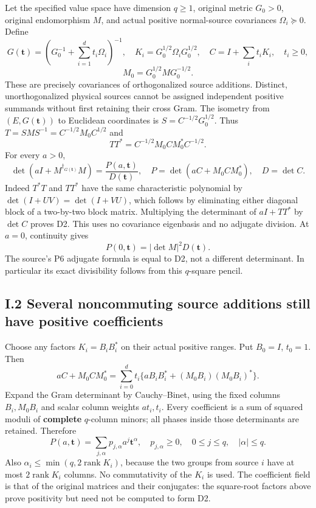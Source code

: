 \documentclass[11pt]{article}
\begin{document}
Let the specified value space have dimension \(q\ge1\), original metric \(G_0>0\), original endomorphism \(M\), and actual positive normal-source covariances \(\Omega_i\succeq0\). Define \[
 G(\boldsymbol t)=(G_0^{-1}+\sum_{i=1}^d t_i\Omega_i)^{-1},\quad
 K_i=G_0^{1/2}\Omega_iG_0^{1/2},\quad
 C=I+\sum_i t_iK_i,\quad t_i\ge0,
\] \[
 M_0=G_0^{1/2}MG_0^{-1/2}.
 \tag{D1}
\] These are precisely covariances of orthogonalized source additions. Distinct, unorthogonalized physical sources cannot be assigned independent positive summands without first retaining their cross Gram. The isometry from \((E,G(\boldsymbol t))\) to Euclidean coordinates is \(S=C^{-1/2}G_0^{1/2}\). Thus \(T=SMS^{-1}=C^{-1/2}M_0C^{1/2}\) and \[
 TT^*=C^{-1/2}M_0CM_0^*C^{-1/2}.
\] For every \(a>0\), \[
 \boxed{\det(aI+M^{\dagger_{G(\boldsymbol t)}}M)
 =\frac{P(a,\boldsymbol t)}{D(\boldsymbol t)},\quad
 P=\det(aC+M_0CM_0^*),\quad D=\det C.}
 \tag{D2}
\] Indeed \(T^*T\) and \(TT^*\) have the same characteristic polynomial by \(\det(I+UV)=\det(I+VU)\), which follows by eliminating either diagonal block of a two-by-two block matrix. Multiplying the determinant of \(aI+TT^*\) by \(\det C\) proves D2. This uses no covariance eigenbasis and no adjugate division. At \(a=0\), continuity gives \[
 P(0,\boldsymbol t)=|\det M|^2D(\boldsymbol t).
 \tag{D3}
\] The source's P6 adjugate formula is equal to D2, not a different determinant. In particular its exact divisibility follows from this \(q\)-square pencil.

\subsection{I.2 Several noncommuting source additions still have positive coefficients}\label{i.2-several-noncommuting-source-additions-still-have-positive-coefficients}

Choose any factors \(K_i=B_iB_i^*\) on their actual positive ranges. Put \(B_0=I\), \(t_0=1\). Then \[
 aC+M_0CM_0^*=
 \sum_{i=0}^d t_i\{aB_iB_i^*+(M_0B_i)(M_0B_i)^*\}.
 \tag{D4}
\] Expand the Gram determinant by Cauchy--Binet, using the fixed columns \(B_i,M_0B_i\) and scalar column weights \(at_i,t_i\). Every coefficient is a sum of squared moduli of \textbf{complete} \(q\)-column minors; all phases inside those determinants are retained. Therefore \[
 P(a,\boldsymbol t)=\sum_{j,\alpha}p_{j,\alpha}a^j\boldsymbol t^\alpha,
 \quad p_{j,\alpha}\ge0,\quad 0\le j\le q,\quad |\alpha|\le q.
 \tag{D5}
\] Also \(\alpha_i\le\min(q,2\operatorname{rank}K_i)\), because the two groups from source \(i\) have at most \(2\operatorname{rank}K_i\) columns. No commutativity of the \(K_i\) is used. The coefficient field is that of the original matrices and their conjugates: the square-root factors above prove positivity but need not be computed to form D2.
\end{document}
